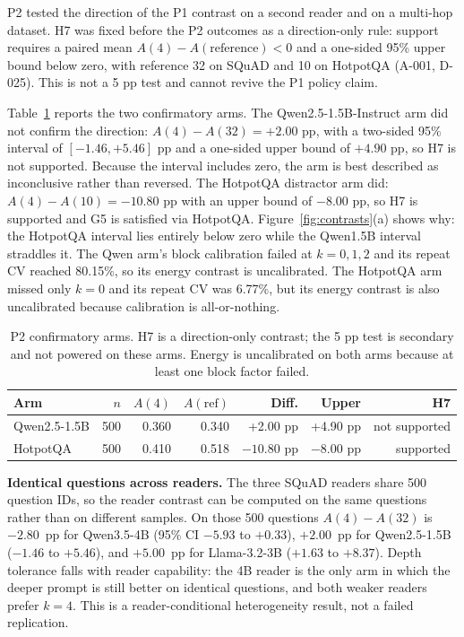 \documentclass[a4paper,fleqn]{cas-sc}
\begin{document}
\label{sec:p2}

P2 tested the direction of the P1 contrast on a second reader and on a multi-hop dataset. H7 was fixed before the P2 outcomes as a direction-only rule: support requires a paired mean $A(4)-A(\text{reference})<0$ and a one-sided 95\% upper bound below zero, with reference 32 on SQuAD and 10 on HotpotQA (A-001, D-025). This is not a 5 pp test and cannot revive the P1 policy claim.

Table~\ref{tab:p2} reports the two confirmatory arms. The Qwen2.5-1.5B-Instruct arm did not confirm the direction: $A(4)-A(32)=+2.00$ pp, with a two-sided 95\% interval of $[-1.46,+5.46]$ pp and a one-sided upper bound of $+4.90$ pp, so H7 is not supported. Because the interval includes zero, the arm is best described as inconclusive rather than reversed. The HotpotQA distractor arm did: $A(4)-A(10)=-10.80$ pp with an upper bound of $-8.00$ pp, so H7 is supported and G5 is satisfied via HotpotQA. Figure~\ref{fig:contrasts}(a) shows why: the HotpotQA interval lies entirely below zero while the Qwen1.5B interval straddles it. The Qwen arm's block calibration failed at $k=0,1,2$ and its repeat CV reached 80.15\%, so its energy contrast is uncalibrated. The HotpotQA arm missed only $k=0$ and its repeat CV was 6.77\%, but its energy contrast is also uncalibrated because calibration is all-or-nothing.

\begin{table}[pos=htbp]
  \centering
  \caption{P2 confirmatory arms. H7 is a direction-only contrast; the 5 pp test is secondary and not powered on these arms. Energy is uncalibrated on both arms because at least one block factor failed.}
  \label{tab:p2}
  \footnotesize
  \setlength{\tabcolsep}{5pt}
  \begin{tabular}{@{}lrrrrrr@{}}
    \toprule
    \textbf{Arm} & $n$ & $A(4)$ & $A(\text{ref})$ & \textbf{Diff.} & \textbf{Upper} & \textbf{H7} \\
    \midrule
    Qwen2.5-1.5B & 500 & 0.360 & 0.340 & +2.00 pp & +4.90 pp & not supported \\
    HotpotQA & 500 & 0.410 & 0.518 & $-10.80$ pp & $-8.00$ pp & supported \\
    \bottomrule
  \end{tabular}
\end{table}

\textbf{Identical questions across readers.} The three SQuAD readers share 500 question IDs, so the reader contrast can be computed on the same questions rather than on different samples. On those 500 questions $A(4)-A(32)$ is $-2.80$~pp for Qwen3.5-4B (95\% CI $-5.93$ to $+0.33$), $+2.00$~pp for Qwen2.5-1.5B ($-1.46$ to $+5.46$), and $+5.00$~pp for Llama-3.2-3B ($+1.63$ to $+8.37$). Depth tolerance falls with reader capability: the 4B reader is the only arm in which the deeper prompt is still better on identical questions, and both weaker readers prefer $k=4$. This is a reader-conditional heterogeneity result, not a failed replication.
\end{document}
